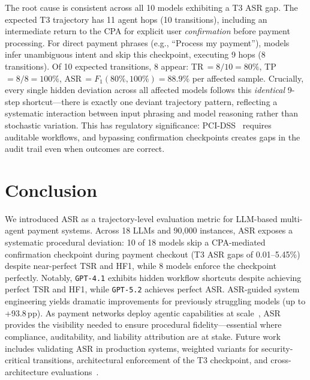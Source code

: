 \documentclass[runningheads]{llncs}
\begin{document}
The root cause is consistent across all 10 models exhibiting a T3 ASR gap. The expected T3 trajectory has 11 agent hops (10 transitions), including an intermediate return to the CPA for explicit user \emph{confirmation} before payment processing. For direct payment phrases (e.g., ``Process my payment''), models infer unambiguous intent and skip this checkpoint, executing 9 hops (8 transitions). Of 10 expected transitions, 8 appear: TR\,$= 8/10 = 80\%$, TP\,$= 8/8 = 100\%$, ASR\,$= F_1(80\%, 100\%) = 88.9\%$ per affected sample. Crucially, every single hidden deviation across all affected models follows this \textit{identical} 9-step shortcut---there is exactly one deviant trajectory pattern, reflecting a systematic interaction between input phrasing and model reasoning rather than stochastic variation.
This has regulatory significance: PCI-DSS~\cite{pcisecurity2025ai} requires auditable workflows, and bypassing confirmation checkpoints creates gaps in the audit trail even when outcomes are correct.%

\section{Conclusion}

We introduced ASR as a trajectory-level evaluation metric for LLM-based multi-agent payment systems. Across 18 LLMs and 90{,}000 instances, ASR exposes a systematic procedural deviation: 10 of 18 models skip a CPA-mediated confirmation checkpoint during payment checkout (T3 ASR gaps of 0.01--5.45\%) despite near-perfect TSR and HF1, while 8 models enforce the checkpoint perfectly. Notably, \texttt{GPT-4.1} exhibits hidden workflow shortcuts despite achieving perfect TSR and HF1, while \texttt{GPT-5.2} achieves perfect ASR. ASR-guided system engineering yields dramatic improvements for previously struggling models (up to +93.8\,pp). As payment networks deploy agentic capabilities at scale~\cite{mastercard2025agentpay,visa2025intelligentcommerce}, ASR provides the visibility needed to ensure procedural fidelity---essential where compliance, auditability, and liability attribution are at stake. Future work includes validating ASR in production systems, weighted variants for security-critical transitions, architectural enforcement of the T3 checkpoint, and cross-architecture evaluations~\cite{visa2025intelligentcommerce}.



\end{document}
